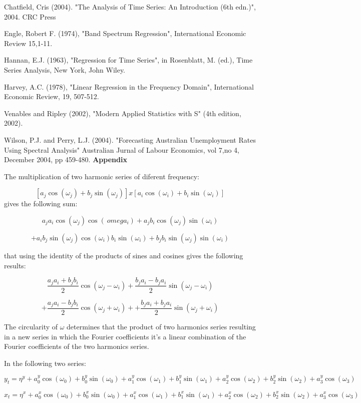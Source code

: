 \documentclass{article}\usepackage[]{graphicx}\usepackage[]{color}
\begin{document}
Chatfield, Cris (2004). "The Analysis of Time Series: An Introduction (6th edn.)", 2004. CRC Press

Engle, Robert F. (1974), "Band Spectrum Regression", International Economic Review 15,1-11.

Hannan, E.J. (1963), "Regression for Time Series", in Rosenblatt, M. (ed.), Time Series Analysis, New York, John Wiley.

Harvey, A.C. (1978), "Linear Regression in the Frequency Domain", International Economic Review, 19, 507-512.

Venables and Ripley (2002), "Modern Applied Statistics with S" (4th edition, 2002).

Wilson, P.J. and  Perry, L.J. (2004). "Forecasting Australian Unemployment Rates Using Spectral Analysis" Australian Jurnal of Labour Economics, vol 7,no 4, December 2004, pp 459-480.
 \newpage
{\bf Appendix}

The multiplication of two harmonic series of diferent frequency:

$$   [a_j\cos (\omega_j)+b_j\sin (\omega_j)]x [a_i\cos (\omega_i)+b_i\sin (\omega_i)]$$
gives the following sum:

$$   a_ja_i\cos(\omega_j)\cos(\ omega_i)+a_jb_i\cos (\omega_j)\sin (\omega_i)$$

$$+a_ib_j\sin (\omega_j)\cos (\omega_i)b_i\sin (\omega_i)+b_jb_i\sin(\omega_j)\sin(\omega_i)$$

that using the identity of the products of sines and cosines gives the following results:

$$ \frac{a_ja_i+b_jb_i}{2}\cos(\omega_j- \omega_i)+ \frac{b_ja_i-b_ja_i}{2}\sin(\omega_j- \omega_i)$$

$$+\frac{a_ja_i-b_jb_i}{2}\cos(\omega_j+ \omega_i)++ \frac{b_ja_i+b_ja_i}{2}\sin(\omega_j+ \omega_i)$$
 
The circularity of $\omega $ determines that the product of two harmonics series resulting in a new series in which the Fourier coefficients it's a linear combination of the Fourier coefficients of the two harmonics series.

In the following two series:

$$ y_t=\eta^y+a_0^y\cos(\omega_0)+b_0^y\sin(\omega_0)+a_1^y\cos(\omega_1)+b_1^y\sin(\omega_1)+ a_2^y\cos(\omega_2)+b_2^y\sin(\omega_2)+a_3^y\cos(\omega_3)$$

$$ x_t=\eta^x+a_0^x\cos(\omega_0)+b_0^x\sin(\omega_0)+a_1^x\cos(\omega_1)+b_1^x\sin(\omega_1)+ a_2^x\cos(\omega_2)+b_2^x\sin(\omega_2)+a_3^x\cos(\omega_3)$$
\end{document}
